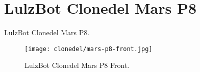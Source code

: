 %
%
%
%
%

\section{LulzBot Clonedel Mars P8}
LulzBot Clonedel Mars P8.

\begin{figure}[h!]
\texttt{[image: clonedel/mars-p8-front.jpg]}
 \caption{LulzBot Clonedel Mars P8 Front.}
 \label{fig:clonedel-mars-p8-front}
\end{figure}


